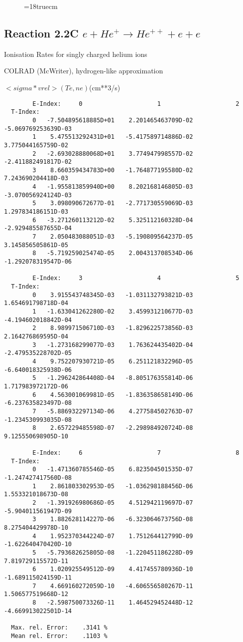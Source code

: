 \begin{figure} \label{2.3.13d}
\epsfxsize=18truecm
\end{figure}
\newpage



\subsection{
Reaction 2.2C $e + He^+ \rightarrow He^{++}  + e  + e $
}
  Ionisation Rates for singly charged helium ions

  COLRAD (McWriter), hydrogen-like approximation

$ <sigma*vrel>(Te,ne) $(cm**3/s)

\begin{verbatim}
        E-Index:     0                     1                     2
  T-Index:
        0   -7.504895618885D+01    2.201465463709D-02   -5.069769253639D-03
        1    5.475513292431D+01   -5.417589714886D-02    3.775044165759D-02
        2   -2.693028880068D+01    3.774947998557D-02   -2.411882491817D-02
        3    8.660359434783D+00   -1.764877195580D-02    7.243690204418D-03
        4   -1.955813859940D+00    8.202168146805D-03   -3.070056924124D-03
        5    3.098090672677D-01   -2.771730559069D-03    1.297834186151D-03
        6   -3.271260113212D-02    5.325112160328D-04   -2.929485587655D-04
        7    2.050483088051D-03   -5.190809564237D-05    3.145856505861D-05
        8   -5.719259025474D-05    2.004313708534D-06   -1.292078319547D-06

        E-Index:     3                     4                     5
  T-Index:
        0    3.915543748345D-03   -1.031132793821D-03    1.654691798718D-04
        1   -1.633041262280D-02    3.459931210677D-03   -4.194602018842D-04
        2    8.989971506710D-03   -1.829622573856D-03    2.164276869595D-04
        3   -1.273168299077D-03    1.763624435402D-04   -2.479535228702D-05
        4    9.752207930721D-05    6.251121832296D-05   -6.640018325938D-06
        5   -1.296242864408D-04   -8.805176355814D-06    1.717983972172D-06
        6    4.563001069981D-05   -1.836358658149D-06   -6.237635823497D-08
        7   -5.886932297134D-06    4.277584502763D-07   -1.234530993035D-08
        8    2.657229485598D-07   -2.298984920724D-08    9.125550698905D-10

        E-Index:     6                     7                     8
  T-Index:
        0   -1.471360785546D-05    6.823504501535D-07   -1.247427417560D-08
        1    2.861803302953D-05   -1.036298188456D-06    1.553321018673D-08
        2   -1.391926980686D-05    4.512942119697D-07   -5.904011561947D-09
        3    1.882628114227D-06   -6.323064673756D-08    8.275404429978D-10
        4    1.952370344224D-07    1.751264412799D-09   -1.622640470420D-10
        5   -5.793682625805D-08   -1.220451186228D-09    7.819729115572D-11
        6    1.020925549512D-09    4.417455780936D-10   -1.689115024159D-11
        7    4.669160272059D-10   -4.606556580267D-11    1.506577519668D-12
        8   -2.598750073326D-11    1.464529452448D-12   -4.669913022501D-14

  Max. rel. Error:    .3141 %
  Mean rel. Error:    .1103 %

\end{verbatim}
